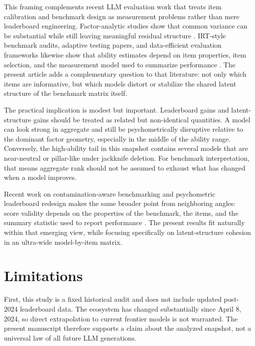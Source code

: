 \documentclass[11pt]{article}
\begin{document}
This framing complements recent LLM evaluation work that treats item calibration and benchmark design as measurement problems rather than mere leaderboard engineering. Factor-analytic studies show that common variance can be substantial while still leaving meaningful residual structure \citep{burnell2023structure, ilic2024interrelated}. IRT-style benchmark audits, adaptive testing papers, and data-efficient evaluation frameworks likewise show that ability estimates depend on item properties, item selection, and the measurement model used to summarize performance \citep{zhou2026lost, tambon2025taskeval, taschetto2025enem, truong2025amortized, li2026adaptive, liao2025legoirt, chen2025irtnet, hofmann2025fluid, krumdick2026abilities, xu2025lart}. The present article adds a complementary question to that literature: not only which items are informative, but which models distort or stabilize the shared latent structure of the benchmark matrix itself.

The practical implication is modest but important. Leaderboard gains and latent-structure gains should be treated as related but non-identical quantities. A model can look strong in aggregate and still be psychometrically disruptive relative to the dominant factor geometry, especially in the middle of the ability range. Conversely, the high-ability tail in this snapshot contains several models that are near-neutral or pillar-like under jackknife deletion. For benchmark interpretation, that means aggregate rank should not be assumed to exhaust what has changed when a model improves.

Recent work on contamination-aware benchmarking and psychometric leaderboard redesign makes the same broader point from neighboring angles: score validity depends on the properties of the benchmark, the items, and the summary statistic used to report performance \citep{wu2025antileakbench, chen2025emnlpcontam, chen2025recentcontam, federiakin2025leaderboards}. The present results fit naturally within that emerging view, while focusing specifically on latent-structure cohesion in an ultra-wide model-by-item matrix.

\section{Limitations}
First, this study is a fixed historical audit and does not include updated post-2024 leaderboard data. The ecosystem has changed substantially since April 8, 2024, so direct extrapolation to current frontier models is not warranted. The present manuscript therefore supports a claim about the analyzed snapshot, not a universal law of all future LLM generations.
\end{document}
